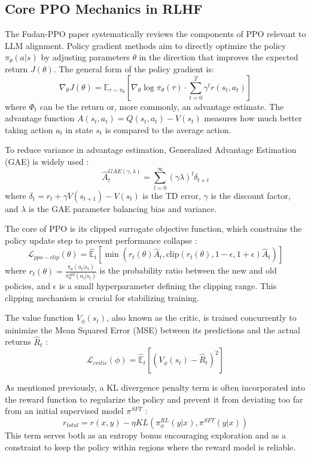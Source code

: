 \documentclass{article} %
\begin{document}
\subsection{Core PPO Mechanics in RLHF}
The Fudan-PPO paper systematically reviews the components of PPO relevant to LLM alignment.
Policy gradient methods aim to directly optimize the policy $\pi_\theta(a|s)$ by adjusting parameters $\theta$ in the direction that improves the expected return $J(\theta)$. \cite{Zheng2023PPO} The general form of the policy gradient is:
$$ \nabla_\theta J(\theta) = \mathbb{E}_{\tau \sim \pi_\theta} \left[ \nabla_\theta \log \pi_\theta(\tau) \cdot \sum_{t=0}^{T} \gamma^t r(s_t, a_t) \right] $$
where $\Phi_t$ can be the return or, more commonly, an advantage estimate. The advantage function $A(s_t, a_t) = Q(s_t, a_t) - V(s_t)$ measures how much better taking action $a_t$ in state $s_t$ is compared to the average action. \cite{Zheng2023PPO}

To reduce variance in advantage estimation, Generalized Advantage Estimation (GAE) is widely used \cite{Zheng2023PPO}:
$$ \hat{A}_t^{GAE(\gamma,\lambda)} = \sum_{l=0}^{\infty} (\gamma\lambda)^l \delta_{t+l} $$
where $\delta_t = r_t + \gamma V(s_{t+1}) - V(s_t)$ is the TD error, $\gamma$ is the discount factor, and $\lambda$ is the GAE parameter balancing bias and variance.

The core of PPO is its clipped surrogate objective function, which constrains the policy update step to prevent performance collapse \cite{Zheng2023PPO}:
$$ \mathcal{L}_{ppo-clip}(\theta)=\hat{\mathbb{E}}_{t}[\min(r_t(\theta)\hat{A}_{t}, \text{clip}(r_t(\theta),1-\epsilon,1+\epsilon)\hat{A}_{t})] $$
where $r_t(\theta) = \frac{\pi_\theta(a_t|s_t)}{\pi_\theta^{old}(a_t|s_t)}$ is the probability ratio between the new and old policies, and $\epsilon$ is a small hyperparameter defining the clipping range. This clipping mechanism is crucial for stabilizing training.

The value function $V_\phi(s_t)$, also known as the critic, is trained concurrently to minimize the Mean Squared Error (MSE) between its predictions and the actual returns $\hat{R}_t$ \cite{Zheng2023PPO}:
$$ \mathcal{L}_{critic}(\phi) = \hat{\mathbb{E}}_{t} \left[ (V_\phi(s_t) - \hat{R}_t)^2 \right] $$

As mentioned previously, a KL divergence penalty term is often incorporated into the reward function to regularize the policy and prevent it from deviating too far from an initial supervised model $\pi^{SFT}$ \cite{Zheng2023PPO}:
$$ r_{total} = r(x,y) - \eta KL(\pi_\phi^{RL}(y|x),\pi^{SFT}(y|x)) $$
This term serves both as an entropy bonus encouraging exploration and as a constraint to keep the policy within regions where the reward model is reliable. \cite{Zheng2023PPO}
\end{document}

